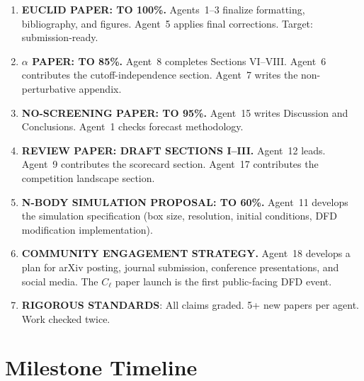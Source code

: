 \documentclass[11pt,a4paper]{article}
\begin{document}
\begin{enumerate}
\item \textbf{EUCLID PAPER: TO 100\%.} Agents~1--3 finalize formatting, bibliography, and figures. Agent~5 applies final corrections. Target: submission-ready.

\item \textbf{$\alpha$ PAPER: TO 85\%.} Agent~8 completes Sections VI--VIII. Agent~6 contributes the cutoff-independence section. Agent~7 writes the non-perturbative appendix.

\item \textbf{NO-SCREENING PAPER: TO 95\%.} Agent~15 writes Discussion and Conclusions. Agent~1 checks forecast methodology.

\item \textbf{REVIEW PAPER: DRAFT SECTIONS I--III.} Agent~12 leads. Agent~9 contributes the scorecard section. Agent~17 contributes the competition landscape section.

\item \textbf{N-BODY SIMULATION PROPOSAL: TO 60\%.} Agent~11 develops the simulation specification (box size, resolution, initial conditions, DFD modification implementation).

\item \textbf{COMMUNITY ENGAGEMENT STRATEGY.} Agent~18 develops a plan for arXiv posting, journal submission, conference presentations, and social media. The $C_\ell$ paper launch is the first public-facing DFD event.

\item \textbf{RIGOROUS STANDARDS}: All claims graded. 5+ new papers per agent. Work checked twice.
\end{enumerate}


\section{Milestone Timeline}
\label{sec:timeline}
\end{document}

